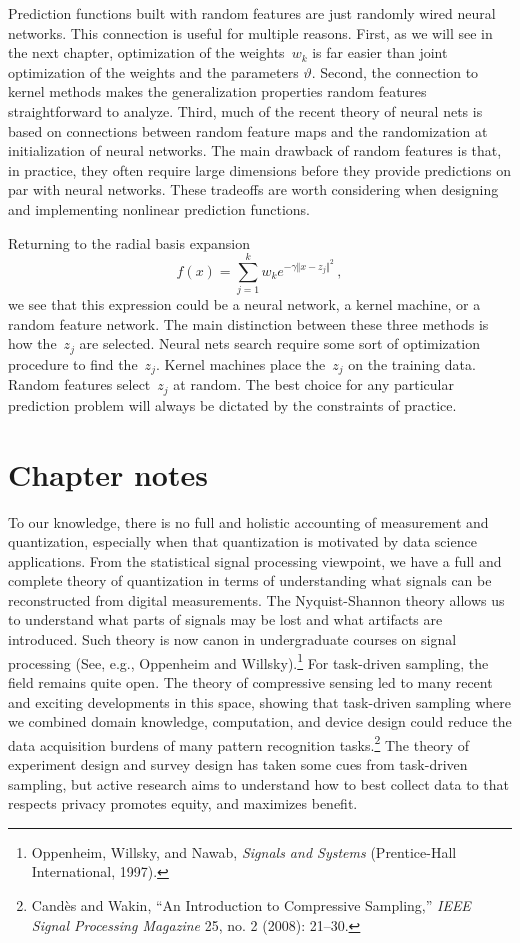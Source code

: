 \documentclass{tufte-book}
\begin{document}
Prediction functions built with random features are just randomly wired
neural networks. This connection is useful for multiple reasons. First,
as we will see in the next chapter, optimization of the weights~\(w_k\)
is far easier than joint optimization of the weights and the parameters
\(\vartheta\). Second, the connection to kernel methods makes the
generalization properties random features straightforward to analyze.
Third, much of the recent theory of neural nets is based on connections
between random feature maps and the randomization at initialization of
neural networks. The main drawback of random features is that, in
practice, they often require large dimensions before they provide
predictions on par with neural networks. These tradeoffs are worth
considering when designing and implementing nonlinear prediction
functions.

Returning to the radial basis expansion \[
    f(x) = \sum_{j=1}^k w_k  e^{-\gamma \Vert x-z_j \Vert^2}\,,
\] we see that this expression could be a neural network, a kernel
machine, or a random feature network. The main distinction between these
three methods is how the~\(z_j\) are selected. Neural nets search
require some sort of optimization procedure to find the~\(z_j\). Kernel
machines place the~\(z_j\) on the training data. Random features
select~\(z_j\) at random. The best choice for any particular prediction
problem will always be dictated by the constraints of practice.

\hypertarget{chapter-notes-3}{%
\section{Chapter notes}\label{chapter-notes-3}}

To our knowledge, there is no full and holistic accounting of
measurement and quantization, especially when that quantization is
motivated by data science applications. From the statistical signal
processing viewpoint, we have a full and complete theory of quantization
in terms of understanding what signals can be reconstructed from digital
measurements. The Nyquist-Shannon theory allows us to understand what
parts of signals may be lost and what artifacts are introduced. Such
theory is now canon in undergraduate courses on signal processing (See,
e.g., Oppenheim and Willsky).\footnote{Oppenheim, Willsky, and Nawab,
  \emph{Signals and Systems} (Prentice-Hall International, 1997).} For
task-driven sampling, the field remains quite open. The theory of
compressive sensing led to many recent and exciting developments in this
space, showing that task-driven sampling where we combined domain
knowledge, computation, and device design could reduce the data
acquisition burdens of many pattern recognition tasks.\footnote{Candès
  and Wakin, {``An Introduction to Compressive Sampling,''} \emph{{IEEE}
  Signal Processing Magazine} 25, no. 2 (2008): 21--30.} The theory of
experiment design and survey design has taken some cues from task-driven
sampling, but active research aims to understand how to best collect
data to that respects privacy promotes equity, and maximizes benefit.
\end{document}
